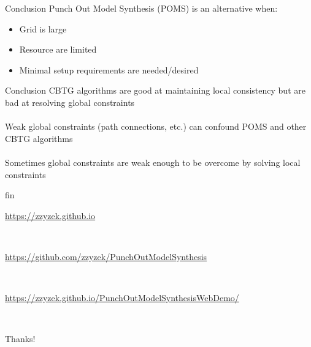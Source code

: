 \documentclass{beamer}
\begin{document}


  \begin{frame}[fragile]{Conclusion}
    Punch Out Model Synthesis (POMS) is an alternative when:
    \begin{itemize}
      \item Grid is large
      \item Resource are limited
      \item Minimal setup requirements are needed/desired
    \end{itemize}
  \end{frame}

  \begin{frame}[fragile]{Conclusion}
    CBTG algorithms are good at maintaining local consistency but are bad at resolving global constraints \\
    \hfill \\
    Weak global constraints (path connections, etc.) can confound POMS and other CBTG algorithms \\
    \hfill \\
    Sometimes global constraints are weak enough to be overcome by solving local constraints
  \end{frame}

  \begin{frame}[fragile]{fin}
    \begin{center}\url{https://zzyzek.github.io}\end{center}
    \hfill \\
    \begin{center}\url{https://github.com/zzyzek/PunchOutModelSynthesis}\end{center}
    \hfill \\
    \begin{center}\small\url{https://zzyzek.github.io/PunchOutModelSynthesisWebDemo/}\end{center}
    \hfill \\
    \begin{center}Thanks!\end{center}
  \end{frame}
\end{document}
